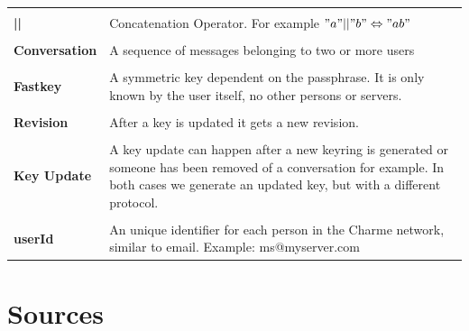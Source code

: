 \documentclass{scrartcl}
\begin{document}
\begin{tabular}{p{4cm} p{10cm} }
          &  \\
\textbf{||} &  Concatenation Operator. For example $"a" || "b" \Leftrightarrow "ab" $ \\\\
\textbf{Conversation} & A sequence of messages belonging to two or more users  \\\\
\textbf{Fastkey} & A symmetric key dependent on the passphrase. It is only known by the user itself, no other persons or servers. \\\\
\textbf{Revision} & After a key is updated it gets a new revision.\\\\

\textbf{Key Update} &
A key update can happen after a new keyring is generated or someone has been removed of a conversation for example. In both cases we generate an updated key, but with a different protocol. \\\\
\textbf{userId} &  An unique identifier for each person in the Charme network, similar to email. Example: ms@myserver.com
\end{tabular}


\clearpage
\section{Sources}
\printbibliography




  
\end{document}
